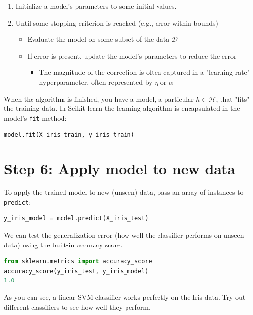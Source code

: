 \documentclass[11pt]{article}
\begin{document}
\begin{enumerate}
\item Initialize a model's parameters to some initial values.
\item Until some stopping criterion is reached (e.g., error within bounds)

\begin{itemize}
\item Evaluate the model on some subset of the data \(\mathcal{D}\)
\item If error is present, update the model's parameters to reduce the error
\begin{itemize}
\item The magnitude of the correction is often captured in a "learning rate" hyperparameter, often represented by \(\eta\) or \(\alpha\)
\end{itemize}
\end{itemize}
\end{enumerate}

When the algorithm is finished, you have a model, a particular \(h \in \mathcal{H}\), that "fits" the training data.  In Scikit-learn the learning algorithm is encapsulated in the model's \texttt{fit} method:

\begin{lstlisting}[language=Python,numbers=none]
model.fit(X_iris_train, y_iris_train)
\end{lstlisting}
\section{Step 6: Apply model to new data}
\label{sec:org185a6e5}

To apply the trained model to new (unseen) data, pass an array of instances to \texttt{predict}:

\begin{lstlisting}[language=Python,numbers=none]
y_iris_model = model.predict(X_iris_test)
\end{lstlisting}

We can test the generalization error (how well the classifier performs on unseen data) using the built-in accuracy score:

\begin{lstlisting}[language=Python,numbers=none]
from sklearn.metrics import accuracy_score
accuracy_score(y_iris_test, y_iris_model)
1.0
\end{lstlisting}

As you can see, a linear SVM classifier works perfectly on the Iris data. Try out different classifiers to see how well they perform.
\end{document}
